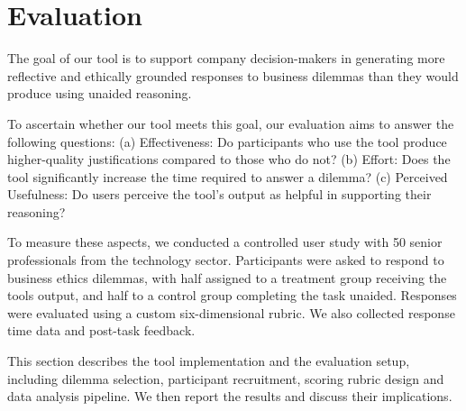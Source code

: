 \section{Evaluation}

The goal of our tool is to support company decision-makers in generating more reflective and ethically grounded responses to business dilemmas than they would produce using unaided reasoning.

To ascertain whether our tool meets this goal, our evaluation aims to answer the following questions:
(a) Effectiveness: Do participants who use the tool produce higher-quality justifications compared to those who do not?
(b) Effort: Does the tool significantly increase the time required to answer a dilemma?
(c) Perceived Usefulness: Do users perceive the tool's output as helpful in supporting their reasoning?

To measure these aspects, we conducted a controlled user study with 50 senior professionals from the technology sector. Participants were asked to respond to business ethics dilemmas, with half assigned to a treatment group receiving the tools output, and half to a control group completing the task unaided. Responses were evaluated using a custom six-dimensional rubric. We also collected response time data and post-task feedback.

This section describes the tool implementation and the evaluation setup, including dilemma selection, participant recruitment, scoring rubric design and data analysis pipeline. We then report the results and discuss their implications.












